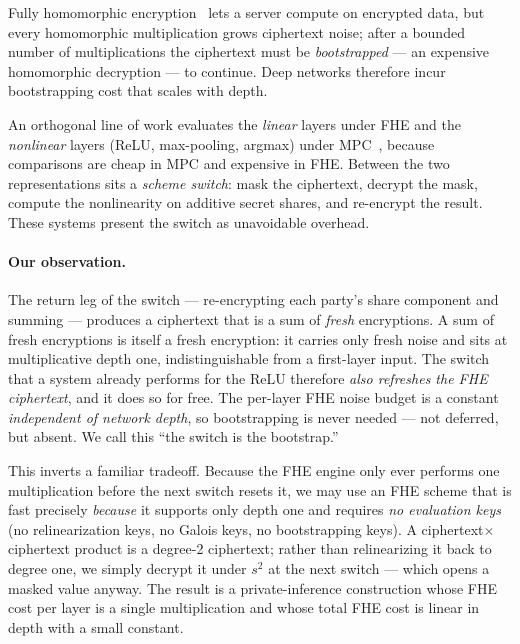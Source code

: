 \documentclass[11pt]{article}
\theoremstyle{plain}
\theoremstyle{definition}
\theoremstyle{remark}
\begin{document}
Fully homomorphic encryption~\cite{Gentry} lets a server compute on
encrypted data, but every homomorphic multiplication grows ciphertext noise;
after a bounded number of multiplications the ciphertext must be
\emph{bootstrapped} --- an expensive homomorphic decryption --- to continue.
Deep networks therefore incur bootstrapping cost that scales with depth.

An orthogonal line of work evaluates the \emph{linear} layers under FHE and
the \emph{nonlinear} layers (ReLU, max-pooling, argmax) under
MPC~\cite{Gazelle,Delphi,Cheetah,CrypTFlow2}, because comparisons are cheap
in MPC and expensive in FHE. Between the two representations sits a
\emph{scheme switch}: mask the ciphertext, decrypt the mask, compute the
nonlinearity on additive secret shares, and re-encrypt the result. These
systems present the switch as unavoidable overhead.

\paragraph{Our observation.} The return leg of the switch --- re-encrypting
each party's share component and summing --- produces a ciphertext that is a
sum of \emph{fresh} encryptions. A sum of fresh encryptions is itself a
fresh encryption: it carries only fresh noise and sits at multiplicative
depth one, indistinguishable from a first-layer input. The switch that a
system already performs for the ReLU therefore \emph{also refreshes the FHE
ciphertext}, and it does so for free. The per-layer FHE noise budget is a
constant \emph{independent of network depth}, so bootstrapping is never
needed --- not deferred, but absent. We call this ``the switch is the
bootstrap.''

This inverts a familiar tradeoff. Because the FHE engine only ever performs
one multiplication before the next switch resets it, we may use an FHE
scheme that is fast precisely \emph{because} it supports only depth one and
requires \emph{no evaluation keys} (no relinearization keys, no Galois keys,
no bootstrapping keys). A ciphertext$\times$ciphertext product is a degree-2
ciphertext; rather than relinearizing it back to degree one, we simply
decrypt it under $s^2$ at the next switch --- which opens a masked value
anyway. The result is a private-inference construction whose FHE cost per
layer is a single multiplication and whose total FHE cost is linear in depth
with a small constant.
\end{document}
